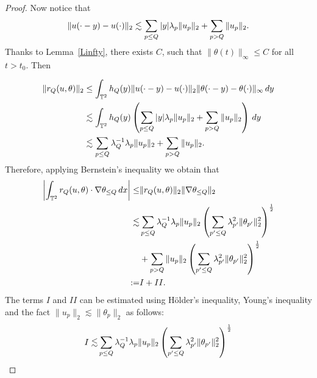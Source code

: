 \documentclass{amsart}
\numberwithin{Theorem}{section}
\theoremstyle{definition}
\theoremstyle{remark}
\begin{document}
\begin{proof}
Now notice that
\begin{equation}\notag
\begin{split}
&\|u(\cdot-y)-u(\cdot)\|_2 \lesssim\sum_{p\leq Q}|y|\lambda_p\|u_p\|_2+\sum_{p> Q}\|u_p\|_2.\\
\end{split}
\end{equation}
Thanks to Lemma~\ref{Linfty}, there exists $C$, such that
$\|\theta(t)\|_\infty \leq C$ for all  $t >t_0$. Then


\begin{equation}\notag
\begin{split}
\|r_Q(u,\theta)\|_2&\leq \int_{\mathbb T^2}h_Q(y)\|u(\cdot-y)-u(\cdot)\|_2\|\theta(\cdot-y)-\theta(\cdot)\|_\infty\,dy\\
&\lesssim \int_{\mathbb T^2}h_Q(y)\left( \sum_{p\leq Q}|y|\lambda_p\|u_p\|_2
+\sum_{p> Q}\|u_p\|_2 \right)\, dy\\
&\lesssim \sum_{p\leq Q}\lambda_Q^{-1}\lambda_p\|u_p\|_2
+\sum_{p> Q}\|u_p\|_2.
\end{split}
\end{equation}
Therefore, applying Bernstein's inequality we obtain that
\begin{equation}\notag
\begin{split}
\left|\int_{\mathbb T^2}r_Q(u,\theta)\cdot\nabla\theta_{\leq Q}\,dx\right|
\leq& \|r_Q(u,\theta)\|_2\|\nabla \theta_{\leq Q}\|_2\\
\lesssim& \sum_{p\leq Q}\lambda_Q^{-1}\lambda_p\|u_p\|_2\left(\sum_{p'\leq Q}\lambda^2_{p'}\|\theta_{p'}\|_2^2\right)^{\frac 12}\\
&+\sum_{p> Q}\|u_p\|_2\left(\sum_{p'\leq Q}\lambda^2_{p'}\|\theta_{p'}\|^2_2\right)^{\frac 12}\\
:= &I+II.
\end{split}
\end{equation}
The terms $I$ and $II$ can be estimated using H\"older's inequality, Young's inequality and the fact $\|u_p\|_2\lesssim \|\theta_p\|_2$ as follows:
\begin{equation}\notag
\begin{split}
I\lesssim &\sum_{p\leq Q}\lambda_Q^{-1}\lambda_p\|u_p\|_2\left(\sum_{p'\leq Q}\lambda^2_{p'}\|\theta_{p'}\|_2^2\right)^{\frac 12}\\

\end{split}
\end{equation}
\end{proof}
\end{document}
